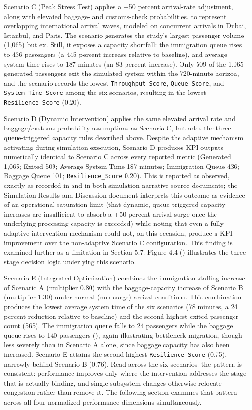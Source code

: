 Scenario C (Peak Stress Test) applies a +50 percent arrival-rate adjustment, along with elevated baggage- and customs-check probabilities, to represent overlapping international arrival waves, modeled on concurrent arrivals in Dubai, Istanbul, and Paris. The scenario generates the study's largest passenger volume (1,065) but ex. Still, it exposes a capacity shortfall: the immigration queue rises to 436 passengers (a 445 percent increase relative to baseline), and average system time rises to 187 minutes (an 83 percent increase). Only 509 of the 1,065 generated passengers exit the simulated system within the 720-minute horizon, and the scenario records the lowest \nolinkurl{Throughput_Score}, \nolinkurl{Queue_Score}, and \nolinkurl{System_Time_Score} among the six scenarios, resulting in the lowest \nolinkurl{Resilience_Score} (0.20).

Scenario D (Dynamic Intervention) applies the same elevated arrival rate and baggage/customs probability assumptions as Scenario C, but adds the three queue-triggered capacity rules described above. Despite the adaptive mechanism activating during simulation execution, Scenario D produces KPI outputs numerically identical to Scenario C across every reported metric (Generated 1,065; Exited 509; Average System Time 187 minutes; Immigration Queue 436; Baggage Queue 101; \nolinkurl{Resilience_Score} 0.20). This is reported as observed, exactly as recorded in  and in both simulation-narrative source documents; the Simulation Results and Discussion document interprets this outcome as evidence of an operational saturation limit (that dynamic, queue-triggered capacity increases are insufficient to absorb a +50 percent arrival surge once the underlying processing capacity is exceeded) while noting that even a fully adaptive intervention mechanism could not, on this occasion, produce a KPI improvement over the non-adaptive Scenario C configuration. This finding is examined further as a limitation in Section 5.7. Figure 4.4 () illustrates the three-stage decision logic underlying this scenario.

Scenario E (Integrated Optimization) combines the immigration-staffing increase of Scenario A (multiplier 0.80) with the baggage-capacity increase of Scenario B (multiplier 1.30) under normal (non-surge) arrival conditions. This combination produces the lowest average system time of the six scenarios (78 minutes, a 24 percent reduction relative to baseline) and the second-highest exited-passenger count (565). The immigration queue falls to 24 passengers while the baggage queue rises to 140 passengers (), again illustrating bottleneck migration, though less severely than in Scenario A alone, since baggage capacity has also been increased. Scenario E attains the second-highest \nolinkurl{Resilience_Score} (0.75), narrowly behind Scenario B (0.76). Read across the six scenarios, the pattern is consistent: performance improves only where the intervention addresses the stage that is actually binding, and single-subsystem changes otherwise relocate congestion rather than remove it. The following section examines that pattern across all four normalized performance dimensions simultaneously.

